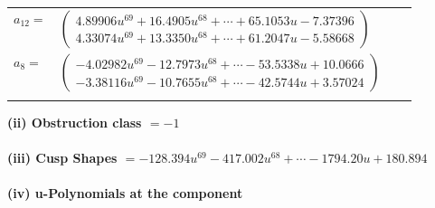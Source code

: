 \documentclass[1p]{elsarticle_modified}
\theoremstyle{definition}
\begin{document}
\begin{tabular}{m{7pt} m{180pt} m{7pt} m{180pt} }
\flushright $a_{12}=$&$\begin{pmatrix}4.89906 u^{69}+16.4905 u^{68}+\cdots+65.1053 u-7.37396\\4.33074 u^{69}+13.3350 u^{68}+\cdots+61.2047 u-5.58668\end{pmatrix}$ \\
\flushright $a_{8}=$&$\begin{pmatrix}-4.02982 u^{69}-12.7973 u^{68}+\cdots-53.5338 u+10.0666\\-3.38116 u^{69}-10.7655 u^{68}+\cdots-42.5744 u+3.57024\end{pmatrix}$\\&\end{tabular}
\flushleft \textbf{(ii) Obstruction class $= -1$}\\~\\
\flushleft \textbf{(iii) Cusp Shapes $= -128.394 u^{69}-417.002 u^{68}+\cdots-1794.20 u+180.894$}\\~\\
\newpage\renewcommand{\arraystretch}{1}
\flushleft \textbf{(iv) u-Polynomials at the component}\newline \\
\end{document}
